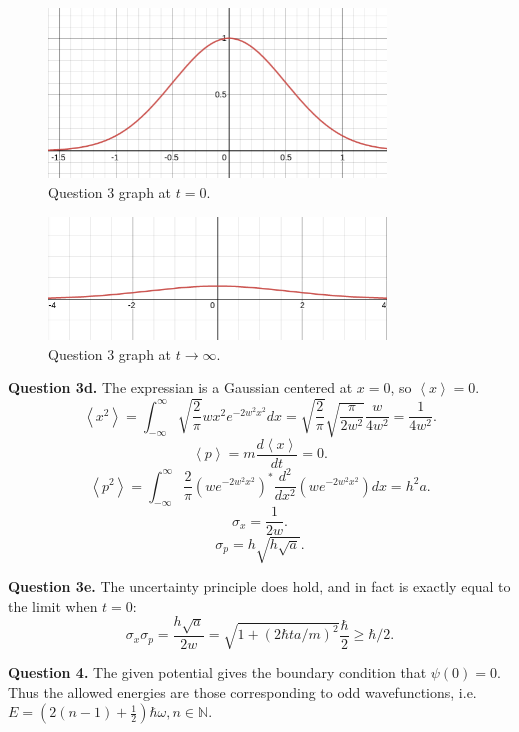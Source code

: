 \documentclass[letterpaper, reqno,11pt]{article}
\begin{document}
\begin{figure}[htpb]
    \centering
    \includegraphics[width=0.8\textwidth]{q3ci.png}
    \caption{Question 3 graph at $t=0$. }
    \label{fig:q3ci}
\end{figure}

\begin{figure}[htpb]
    \centering
    \includegraphics[width=0.8\textwidth]{q3cii.png}
    \caption{Question 3 graph at $t\to\infty$. }
    \label{fig:q3cii}
\end{figure}

{\noindent\bf Question 3d.} The expressian is a Gaussian centered at $x=0$, so $\left<x \right>=0$.
\[
\left<x^2 \right>=\int_{-\infty}^{\infty}\sqrt{\frac{2}{\pi}}wx^2 e^{-2w^2x^2}dx=\sqrt{\frac{2}{\pi}} \sqrt{\frac{\pi}{2w^2}} \frac{w}{4w^2}=\frac{1}{4w^2}
.\]
\[
\left<p \right>=m\frac{d\left<x \right>}{dt}=0
.\]
\[
\left<p^2 \right>=\int_{-\infty}^{\infty}\frac{2}{\pi}\left( w e^{-2w^2x^2} \right)^* \frac{d^2}{dx^2}\left( we^{-2w^2x^2} \right)  dx=h^2a
.\]
\[
\sigma_x=\frac{1}{2w}
.\]
\[
\sigma_p=h\sqrt{h\sqrt{a} } 
.\]

{\noindent\bf Question 3e.} The uncertainty principle does hold, and in fact is exactly equal to the limit when $t=0$: 
\[
\sigma_x\sigma_p=\frac{h\sqrt{a} }{2w}=\sqrt{1+(2\hbar ta /m)^2} \frac{\hbar}{2}\geq \hbar /2
.\]

{\noindent\bf Question 4.} The given potential gives the boundary condition that $\psi(0)=0$. Thus the allowed energies are those corresponding to odd wavefunctions, i.e. $E=(2(n-1)+\frac{1}{2})\hbar\omega, n\in\mathbb{N}$. 
\end{document}
